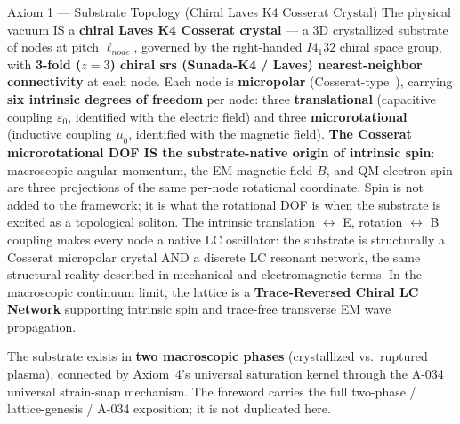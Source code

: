 \begin{resultbox}{Axiom 1 — Substrate Topology (Chiral Laves K4 Cosserat Crystal)}
The physical vacuum IS a \textbf{chiral Laves K4 Cosserat crystal} --- a 3D crystallized substrate of nodes at pitch $\ell_{node}$, governed by the right-handed $I4_1 32$ chiral space group, with \textbf{3-fold ($z=3$) chiral srs (Sunada-K4 / Laves) nearest-neighbor connectivity} at each node. Each node is \textbf{micropolar} (Cosserat-type~\cite{cosserat1909deformables}), carrying \textbf{six intrinsic degrees of freedom} per node: three \textbf{translational} (capacitive coupling $\varepsilon_0$, identified with the electric field) and three \textbf{microrotational} (inductive coupling $\mu_0$, identified with the magnetic field). \textbf{The Cosserat microrotational DOF IS the substrate-native origin of intrinsic spin}: macroscopic angular momentum, the EM magnetic field $B$, and QM electron spin are three projections of the same per-node rotational coordinate. Spin is not added to the framework; it is what the rotational DOF is when the substrate is excited as a topological soliton. The intrinsic translation $\leftrightarrow$ E, rotation $\leftrightarrow$ B coupling makes every node a native LC oscillator: the substrate is structurally a Cosserat micropolar crystal AND a discrete LC resonant network, the same structural reality described in mechanical and electromagnetic terms. In the macroscopic continuum limit, the lattice is a \textbf{Trace-Reversed Chiral LC Network} supporting intrinsic spin and trace-free transverse EM wave propagation.

\medskip\noindent
The substrate exists in \textbf{two macroscopic phases} (crystallized vs.\ ruptured plasma), connected by Axiom~4's universal saturation kernel through the A-034 universal strain-snap mechanism. The foreword carries the full two-phase / lattice-genesis / A-034 exposition; it is not duplicated here.


\end{resultbox}
